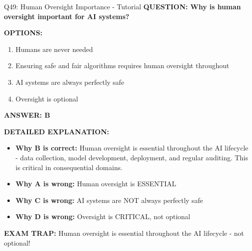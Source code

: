 \documentclass[8pt]{beamer}
\begin{document}
	\begin{frame}{Q49: Human Oversight Importance - Tutorial}
		\fontsize{6.5}{7.5}\selectfont
		\textbf{QUESTION: Why is human oversight important for AI systems?}
		
		\vspace{0.1cm}
		\textbf{OPTIONS:}
		\begin{enumerate}
			\item Humans are never needed
			\item Ensuring safe and fair algorithms requires human oversight throughout
			\item AI systems are always perfectly safe
			\item Oversight is optional
		\end{enumerate}
		
		\vspace{0.1cm}
		\textcolor{myblue}{\textbf{ANSWER: B}}
		
		\vspace{0.1cm}
		\textbf{DETAILED EXPLANATION:}
		\begin{itemize}
			\item \textbf{Why B is correct:} Human oversight is essential throughout the AI lifecycle - data collection, model development, deployment, and regular auditing. This is critical in consequential domains.
			\item \textbf{Why A is wrong:} Human oversight is ESSENTIAL
			\item \textbf{Why C is wrong:} AI systems are NOT always perfectly safe
			\item \textbf{Why D is wrong:} Oversight is CRITICAL, not optional
		\end{itemize}
		
		\textcolor{myred}{\textbf{EXAM TRAP:}} Human oversight is \textcolor{myblue}{essential throughout the AI lifecycle} - not optional!
	\end{frame}
	
\end{document}
